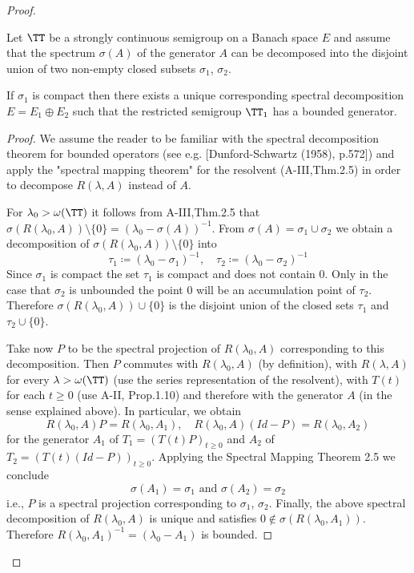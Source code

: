 \begin{proof}
\begin{theorem}\label{thm:a3-3.3}

Let $\TT$ be a strongly continuous semigroup on a Banach space $E$ and assume that the spectrum $\sigma(A)$ of the generator $A$ can be decomposed into the disjoint union of two non-empty closed subsets $\sigma_{1}$, $\sigma_{2}$.

If $\sigma_{1}$ is compact then there exists a unique corresponding spectral decomposition $E = E_{1} \oplus E_{2}$ such that the restricted semigroup $\TT_{1}$ has a bounded generator.
\end{theorem}

\begin{proof}
We assume the reader to be familiar with the spectral decomposition theorem for bounded operators (see e.g. [Dunford-Schwartz (1958), p.572]) and apply the "spectral mapping theorem" for the resolvent (A-III,Thm.2.5) in order to decompose $R(\lambda,A)$ instead of $A$.

For $\lambda_{0} > \omega(\TT)$ it follows from A-III,Thm.2.5 that $\sigma(R(\lambda_{0},A)) \setminus \{0\} = (\lambda_{0} - \sigma(A))^{-1}$.
From $\sigma(A) = \sigma_{1} \cup \sigma_{2}$ we obtain a decomposition of $\sigma(R(\lambda_{0},A)) \setminus \{0\}$ into
\[
\tau_{1} \coloneqq (\lambda_{0}-\sigma_{1})^{-1}, \quad \tau_{2} \coloneqq (\lambda_{0}-\sigma_{2})^{-1}
\]
Since $\sigma_{1}$ is compact the set $\tau_{1}$ is compact and does not contain $0$.
Only in the case that $\sigma_{2}$ is unbounded the point $0$ will be an accumulation point of $\tau_{2}$.
Therefore $\sigma(R(\lambda_{0},A)) \cup \{0\}$ is the disjoint union of the closed sets $\tau_{1}$ and $\tau_{2} \cup \{0\}$.

Take now $P$ to be the spectral projection of $R(\lambda_{0},A)$ corresponding to this decomposition.
Then $P$ commutes with $R(\lambda_{0},A)$ (by definition), with $R(\lambda,A)$ for every $\lambda > \omega(\TT)$ (use the series representation of the resolvent), with $T(t)$ for each $t \geq 0$ (use A-II, Prop.1.10) and therefore with the generator $A$ (in the sense explained above).
In particular, we obtain
\[
R(\lambda_{0},A)P = R(\lambda_{0},A_{1}), \quad R(\lambda_{0},A)(Id-P) = R(\lambda_{0},A_{2})
\]
for the generator $A_{1}$ of $T_{1} = (T(t)P)_{t \geq 0}$ and $A_{2}$ of $T_{2} = (T(t)(Id-P))_{t \geq 0}$.
Applying the Spectral Mapping Theorem 2.5 we conclude
\[
\sigma(A_{1}) = \sigma_{1} \text{ and } \sigma(A_{2}) = \sigma_{2}
\]
i.e., $P$ is a spectral projection corresponding to $\sigma_{1}$, $\sigma_{2}$.
Finally, the above spectral decomposition of $R(\lambda_{0},A)$ is unique and satisfies $0 \notin \sigma(R(\lambda_{0},A_{1}))$.
Therefore $R(\lambda_{0},A_{1})^{-1} = (\lambda_{0}-A_{1})$ is bounded.
\end{proof}



\end{proof}

